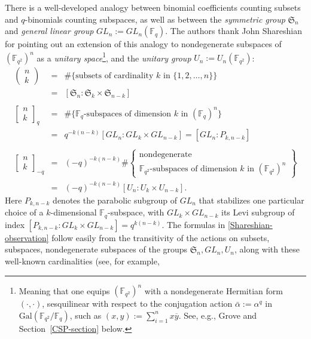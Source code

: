 \documentclass[10pt]{amsart}
\theoremstyle{plain}
\theoremstyle{definition}
\theoremstyle{remark}
\numberwithin{equation}{section}
\newcommand\qbin[3]{\left[\begin{matrix} #1 \\ #2 \end{matrix} \right]_{#3}}
\newcommand\FF{\mathbb{F}}
\newcommand\symm{\mathfrak{S}}
\begin{document}
There is a well-developed analogy between 
binomial coefficients counting subsets and $q$-binomials counting
subspaces, as well as between the {\it symmetric group} $\symm_n$ and 
{\it general linear group} $GL_n:=GL_n(\FF_q)$.
The authors thank John Shareshian for pointing out an
extension of this analogy to nondegenerate subspaces of $(\FF_{q^2})^n$ as 
a {\it unitary space}\footnote{Meaning that
one equips $(\FF_{q^2})^n$ with a nondegenerate
Hermitian form $(\cdot,\cdot)$, sesquilinear with respect to the conjugation
action $\bar{\alpha}:=\alpha^q$ in $\mathrm{Gal}(\FF_{q^2}/\FF_q)$,
such as $(x,y):=\sum_{i=1}^n x \overline{y}$. See, e.g., Grove \cite[Chapter 10]{Grove} and
Section~\ref{CSP-section} below.},
and the {\it unitary group} $U_n:=U_n(\FF_{q^2})$:
\begin{equation}
\label{Shareshian-observation}
\begin{array}{rcl}
\left( \begin{matrix} n \\ k \end{matrix} \right)
&=& \#\{ \text{subsets of cardinality }k\text{ in }\{1,2,\ldots,n\} \}  \\
&=& [ \symm_n : \symm_k \times \symm_{n-k} ]  \\
& &  \\
\qbin{n}{k}{q}
&=& \#\{ \FF_{q}\text{-subspaces of dimension }k\text{ in }(\FF_{q})^n \}  \\
&=&q^{-k(n-k)}[ GL_n: GL_k \times GL_{n-k} ] =[ GL_n : P_{k,n-k} ]\\
& &  \\
\qbin{n}{k}{-q} 
&=&(-q)^{-k(n-k)}
\#\left\{ \begin{matrix} 
           \text{nondegenerate } \\
          \FF_{q^2}\text{-subspaces of dimension }k\text{ in }(\FF_{q^2})^n
          \end{matrix} 
  \right\}\\
&=&(-q)^{-k(n-k)}[U_n : U_k \times U_{n-k} ].
\end{array}
\end{equation}
Here $P_{k,n-k}$ denotes the parabolic subgroup of $GL_n$ 
that stabilizes one particular choice of a $k$-dimensional
$\FF_q$-subspace, with $GL_k \times GL_{n-k}$ its Levi subgroup of
index $[P_{k,n-k}:GL_k \times GL_{n-k}]=q^{k(n-k)}$.
The formulas in  \eqref{Shareshian-observation}
follow easily from the transitivity of the actions 
on subsets, subspaces, nondegenerate subspaces of the groups $\symm_n, GL_n, U_n$, 
along with these well-known cardinalities (see, for example, 
\end{document}
